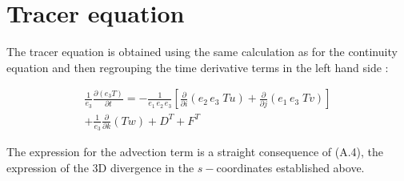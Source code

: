 \documentclass[../main/NEMO_manual]{subfiles}
\begin{document}
\section{Tracer equation}
\label{sec:A_tracer}

The tracer equation is obtained using the same calculation as for the continuity equation and then
regrouping the time derivative terms in the left hand side :

\begin{multline}
  \label{apdx:A_tracer}
  \frac{1}{e_3} \frac{\partial \left(  e_3 T  \right)}{\partial t}
  = -\frac{1}{e_1 \,e_2 \,e_3}
  \left[           \frac{\partial }{\partial i} \left( {e_2 \,e_3 \;Tu} \right)
    +   \frac{\partial }{\partial j} \left( {e_1 \,e_3 \;Tv} \right)               \right]       \\
  +  \frac{1}{e_3}  \frac{\partial }{\partial k} \left(                   Tw  \right)
  +  D^{T} +F^{T}
\end{multline}

The expression for the advection term is a straight consequence of (A.4),
the expression of the 3D divergence in the $s-$coordinates established above. 

\biblio
\end{document}
